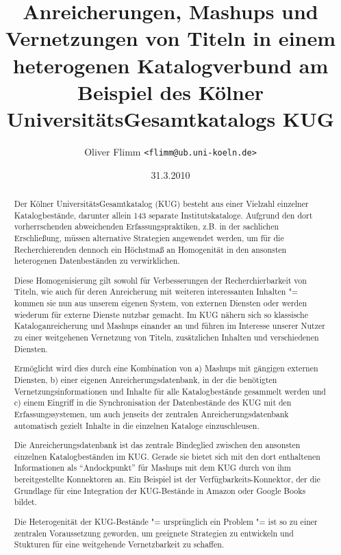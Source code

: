 \documentclass[11pt]{scrartcl}
\title{Anreicherungen, Mashups und Vernetzungen von Titeln in einem heterogenen Katalogverbund am Beispiel des Kölner UniversitätsGesamtkatalogs KUG}
\author{Oliver Flimm \texttt{<flimm@ub.uni-koeln.de>}}
\date{31.3.2010}
\begin{document}
\begin{titlepage}

\maketitle

\enlargethispage{10cm} 
\thispagestyle{empty}
\begin{abstract}
\parindent0.0mm
\parskip0.3cm    
Der Kölner UniversitätsGesamtkatalog (KUG) besteht aus einer Vielzahl
einzelner Katalogbestände, darunter allein 143 separate
Institutskataloge. Aufgrund den dort vorherrschenden abweichenden
Erfassungspraktiken, z.B. in der sachlichen Erschließung, müssen
alternative Strategien angewendet werden, um für die Recherchierenden
dennoch ein Höchstmaß an Homogenität in den ansonsten heterogenen
Datenbeständen zu verwirklichen.

Diese Homogenisierung gilt sowohl für Verbesserungen der
Recherchierbarkeit von Titeln, wie auch für deren Anreicherung mit
weiteren interessanten Inhalten "= kommen sie nun aus unserem eigenen
System, von externen Diensten oder werden wiederum für externe Dienste
nutzbar gemacht. Im KUG nähern sich so klassische Kataloganreicherung
und Mashups einander an und führen im Interesse unserer Nutzer zu
einer weitgehenen Vernetzung von Titeln, zusätzlichen Inhalten und
verschiedenen Diensten.

Ermöglicht wird dies durch eine Kombination von a) Mashups mit
gängigen externen Diensten, b) einer eigenen Anreicherungsdatenbank,
in der die benötigten Vernetzungsinformationen und Inhalte für alle
Katalogbestände gesammelt werden und c) einem Eingriff in die
Synchronisation der Datenbestände des KUG mit den Erfassungssystemen,
um auch jenseits der zentralen Anreicherungsdatenbank automatisch
gezielt Inhalte in die einzelnen Kataloge einzuschleusen.

Die Anreicherungsdatenbank ist das zentrale Bindeglied zwischen den
ansonsten einzelnen Katalogbeständen im KUG. Gerade sie bietet sich
mit den dort enthaltenen Informationen als "`Andockpunkt"' für Mashups
mit dem KUG durch von ihm bereitgestellte Konnektoren an. Ein Beispiel
ist der Verfügbarkeits-Konnektor, der die Grundlage für eine
Integration der KUG-Bestände in Amazon oder Google Books bildet.

Die Heterogenität der KUG-Bestände "= ursprünglich ein Problem "= ist so
zu einer zentralen Voraussetzung geworden, um geeignete Strategien zu
entwickeln und Stukturen für eine weitgehende Vernetzbarkeit zu
schaffen. 
\end{abstract}
\end{titlepage}
\end{document}
